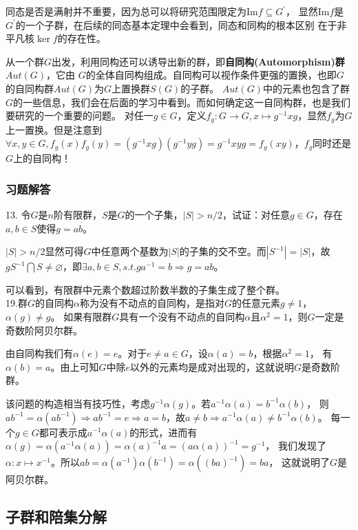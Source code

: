 \documentclass{article}
\begin{document}
同态是否是满射并不重要，因为总可以将研究范围限定为$\text{Im}f \subseteq G^{\prime}$，
显然$\text{Im}f$是$G^{\prime}$的一个子群，在后续的同态基本定理中会看到，同态和同构的根本区别
在于非平凡核$\ker f$的存在性。
 
从一个群$G$出发，利用同构还可以诱导出新的群，即\textbf{自同构(Automorphism)群}$Aut(G)$，它由
$G$的全体自同构组成。自同构可以视作条件更强的置换，也即$G$的自同构群$Aut(G)$为$G$上置换群$S(G)$的子群。
$Aut(G)$中的元素也包含了群$G$的一些信息，我们会在后面的学习中看到。而如何确定这一自同构群，也是我们要研究的一个重要的问题。
对任一$g \in G$，定义$f_g:G \to G, x \mapsto g^{-1}xg$，显然$f_g$为$G$上一置换。但是注意到$\forall x,y \in G,
f_g(x)f_g(y)=(g^{-1}xg)(g^{-1}yg)=g^{-1}xyg=f_g(xy)$，$f_g$同时还是$G$上的自同构！\\


\subsubsection*{习题解答}
13. 令$G$是$n$阶有限群，$S$是$G$的一个子集，$|S| > n/2$，试证：对任意$g \in G$，存在
$a,b \in S$使得$g=ab$。

$|S| > n/2$显然可得$G$中任意两个基数为$|S|$的子集的交不空。而$|S^{-1}|=|S|$，故
$gS^{-1} \bigcap S \neq \varnothing$，即$\exists a,b \in S, s.t. ga^{-1}=b \Rightarrow g=ab$。

可以看到，有限群中元素个数超过阶数半数的子集生成了整个群。\\

19.群$G$的自同构$\alpha$称为没有不动点的自同构，是指对$G$的任意元素$g\neq 1$，$\alpha(g) \neq g$。
如果有限群$G$具有一个没有不动点的自同构$\alpha$且$\alpha^2=1$，则$G$一定是奇数阶阿贝尔群。

由自同构我们有$\alpha(e)=e$。对于$e \neq a \in G$，设$\alpha(a)=b$，根据$\alpha^2=1$，
有$\alpha(b)=a$。由上可知$G$中除$e$以外的元素均是成对出现的，这就说明$G$是奇数阶群。

该问题的构造相当有技巧性，考虑$g^{-1}\alpha(g)$。若$a^{-1}\alpha(a)=b^{-1}\alpha(b)$，
则$ab^{-1}=\alpha(ab^{-1}) \Rightarrow ab^{-1}=e \Rightarrow a=b$，故$a \neq b \Rightarrow a^{-1}\alpha(a) \neq b^{-1}\alpha(b)$。
每一个$g \in G$都可表示成$a^{-1}\alpha(a)$的形式，进而有$\alpha(g)=\alpha(a^{-1}\alpha(a))=\alpha(a)^{-1}a = (a\alpha(a))^{-1} = g^{-1}$，
我们发现了$\alpha: x \mapsto x^{-1}$。所以$ab=\alpha(a^{-1})\alpha(b^{-1})=\alpha((ba)^{-1})=ba$，
这就说明了$G$是阿贝尔群。

\subsection{子群和陪集分解}
\end{document}
